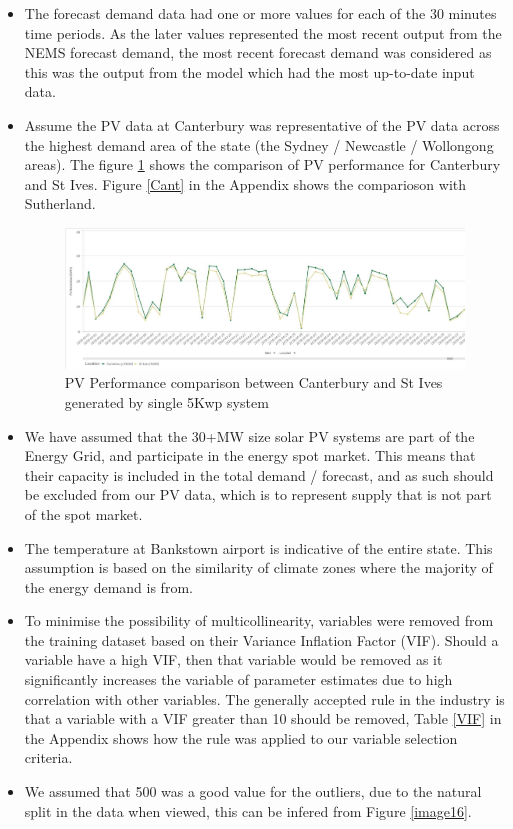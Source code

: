 \documentclass[mstat,12pt]{unswthesis}
\begin{document}
\begin{itemize}
\item The forecast demand data had one or more values for each of the 30 minutes time periods. As the later values represented the most recent output from the NEMS forecast demand, the most recent forecast demand was considered  as this was the output from the model which had the most up-to-date input data\cite{abcb_2015_climate}.
\item \label{pvSiteAssume}Assume the PV data at Canterbury was representative of the PV data across the highest demand area of the state (the Sydney / Newcastle / Wollongong areas). The figure \ref{assume} shows the comparison of PV performance for Canterbury and St Ives. Figure \ref{Cant} in the Appendix shows the comparioson with Sutherland\cite{abcb_2015_climate}.
\begin{figure}[H]
\includegraphics[width=140mm]{image25.jpg}
\caption{PV Performance comparison between Canterbury and St Ives generated by single 5Kwp system }
\label{assume}
\end{figure}
\item \label{30MW}We have assumed that the  30+MW size solar PV systems are part of the Energy Grid, and participate in the energy spot market. This means that their capacity is included in the total demand / forecast, and as such should be excluded from our PV data, which is to represent  supply that is not part of the spot market\cite{brinsmead_2014_energy}.
\item The temperature at Bankstown airport is indicative of the entire state. This assumption is based on the similarity of climate zones\cite{abcb_2015_climate} where the majority of the energy demand is from.
\item To minimise the possibility of multicollinearity, variables were removed from the training dataset based on their Variance Inflation Factor (VIF). Should a variable have a high VIF, then that variable would be removed as it significantly increases the variable of parameter estimates due to high correlation with other variables. The generally accepted rule in the industry is that a variable with a VIF greater than 10 should be removed, Table \ref{VIF} in the Appendix shows how the rule was applied to our variable selection criteria\cite{pvatcheva_2016_multicollinearity}.
\item We assumed that 500 was a good value for the outliers, due to the natural split in the data when viewed, this can be infered from Figure \ref{image16}.
\end{itemize}
\end{document}
